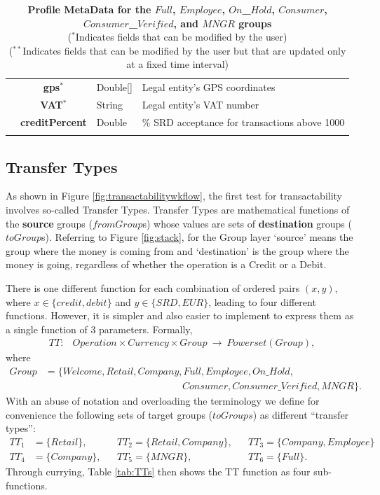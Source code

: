 \begin{table}[H]
\begin{centering}
{\begin{tabular}{ r | c | l | l }
			& {\bf gps}$^*$				&Double[]	& Legal entity's GPS coordinates \\
			& {\bf VAT}$^*$				&String	& Legal entity's VAT number \\
			& {\bf creditPercent}			&Double	& \% SRD acceptance for transactions above 1000 \\
\Xhline{1.5pt}
\end{tabular}
}
\caption{\small\textbf{Profile MetaData for the $Full$, $Employee$, $On$\_$Hold$, $Consumer$, $Consumer$\_$Verified$, and $MNGR$ groups}\\
($^*$Indicates fields that can be modified by the user)\\
($^{**}$Indicates fields that can be modified by the user but that are updated only at a fixed time interval)
}
\label{tab:ProfileMetaData2}
\end{centering}
\vspace{-1.0cm}
\end{table}

\subsection{Transfer Types}
\label{subsec:perm-trans-types}
As shown in Figure \ref{fig:transactabilitywkflow}, the first test for transactability involves so-called Transfer Types. Transfer Types are mathematical functions of the {\bf source} groups ($fromGroup$s) whose values are sets of {\bf destination} groups ($toGroup$s). Referring to Figure \ref{fig:stack}, for the Group layer `source' means the group where the money is coming from and `destination' is the group  where the money is going, regardless of whether the operation is a Credit or a Debit.

There is one different function for each combination of ordered pairs $(x, y)$, where $x \in \{ credit, debit \}$ and $y \in \{ SRD, EUR \}$, leading to four different functions. However, it is simpler and also easier to implement to express them as a single function of 3 parameters. Formally,
\begin{align}
TT\colon &Operation \times Currency \times Group\ \rightarrow\ Powerset(Group),
\end{align}
where
\begin{align}
Group &= \{ Welcome, Retail, Company, Full, Employee, On\text{\_}Hold,  \nonumber \\
		& \qquad\qquad\qquad\qquad\qquad\qquad\qquad
			Consumer, Consumer\text{\_}Verified, MNGR \}.
\end{align}
With an abuse of notation and overloading the terminology we define for convenience the following sets of target groups ($toGroups$) as different ``transfer types'':
\begin{align*}
TT_1 &= \{ Retail \},		&& TT_2 = \{ Retail, Company \},	&& TT_3 = \{ Company, Employee \} \\
TT_4 &= \{ Company \},	&& TT_5 = \{ MNGR \},			&& TT_6 = \{ Full \}.
\end{align*}
Through currying, Table \ref{tab:TTs} then shows the TT function as four sub-functions.

